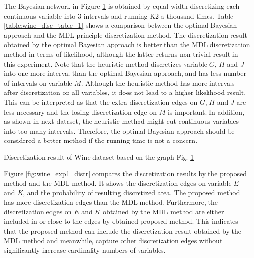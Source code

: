 The Bayesian network in Figure \ref{fig:wine_graph_1} is obtained by equal-width discretizing each continuous variable into 3 intervals and running K2 a thousand times. Table \ref{table:wine_disc_table_1} shows a comparison between the optimal Bayesian approach and the MDL principle discretization method.
The discretization result obtained by the optimal Bayesian approach is better than the MDL discretization method in terms of likelihood, although the latter returns non-trivial result in this experiment. Note that the 
heuristic method discretizes variable $G$, $H$ and $J$ into one more interval than the optimal Bayesian approach, and has less number of intervals on variable $M$. Although the heuristic method has more intervals after discretization on all variables, it does not lead to a higher likelihood result. This can be interpreted as that the extra discretization edges on $G$, $H$ and $J$ are less necessary and the losing discretization edge on $M$ is important.
In addition, as shown in next dataset, the heuristic method might cut continuous variables into too many intervals. Therefore, the optimal Bayesian approach should be considered a better method if the running time is not a concern.

\begin{figure}[ht]
  \centering
      
  \caption{}
  \label{fig:wine_graph_1}
\end{figure}

\begin{table}
  \centering
  \scalebox{1.0}{
  
  }
  \caption{Discretization result of Wine dataset based on the graph Fig. \ref{fig:wine_graph_1}
  }
  \label{table:wine_disc_table_1}
\end{table}

Figure \ref{fig:wine_exp1_distr} compares the discretization results by the proposed method and the MDL method. It shows the discretization edges on variable $E$ and $K$, and the probability of resulting discretized area. The proposed method has more discretization edges than the MDL method. Furthermore, the discretization edges on $E$ and $K$ obtained by the MDL method are either included in or close to the edges by obtained proposed method. This indicates that the proposed method can include the discretization result obtained by the MDL method and meanwhile, capture other discretization edges without significantly increase cardinality numbers of variables.

